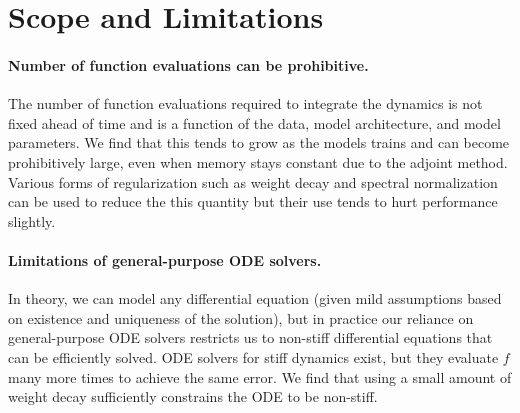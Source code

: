 \documentclass{article} %
\newcommand{\TODO}[1]{{\color{red}TODO: #1}}
\newcommand{\methodname}{FFJORD\xspace}
\newcommand\0{\kern-1.2pt\vec{\kern1.2pt 0}}
\begin{document}
\section{Scope and Limitations}



\paragraph{Number of function evaluations can be prohibitive.} The number of function evaluations required to integrate the dynamics is not fixed ahead of time and is a function of the data, model architecture, and model parameters.
We find that this tends to grow as the models trains and can become prohibitively large, even when memory stays constant due to the adjoint method.
Various forms of regularization such as weight decay and spectral normalization~\citep{miyato2018spectral} can be used to reduce the this quantity but their use tends to hurt performance slightly. 

\paragraph{Limitations of general-purpose ODE solvers.} In theory, we can model any differential equation (given mild assumptions based on existence and uniqueness of the solution), but in practice our reliance on general-purpose ODE solvers restricts us to non-stiff differential equations that can be efficiently solved.
ODE solvers for stiff dynamics exist, but they evaluate $f$ many more times to achieve the same error. 
We find that using a small amount of weight decay sufficiently constrains the ODE to be non-stiff.
\end{document}
